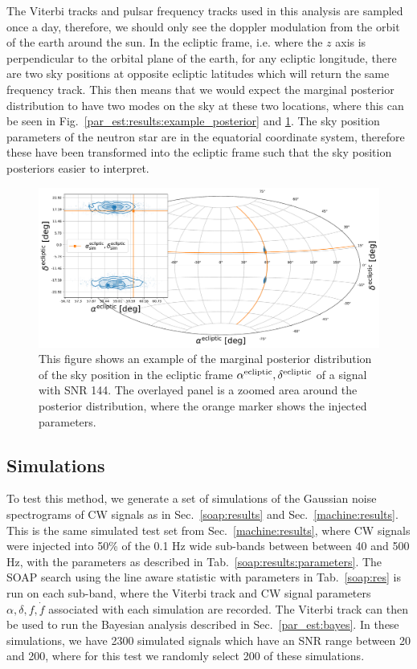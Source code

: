 The Viterbi tracks and pulsar frequency tracks used in this analysis are sampled once a day, therefore, we should only see the doppler modulation from the orbit of the earth around the sun.
In the ecliptic frame, i.e. where the $z$ axis is perpendicular to the orbital plane of the earth, for any ecliptic longitude, there are two sky positions at opposite ecliptic latitudes which will return the same frequency track. 
This then means that we would expect the marginal posterior distribution to have two modes on the sky at these two locations, where this can be seen in Fig.~\ref{par_est:results:example_posterior} and \ref{par_est:results:example_skypos}.
The sky position parameters of the neutron star are in the equatorial coordinate system, therefore these have been transformed into the ecliptic frame such that the sky position posteriors easier to interpret.
%
\begin{figure}[ht]
    \centering
    \includegraphics[width=\linewidth]{C5_parameter/skypos_ecliptic.pdf}
    \caption[Example of posterior of sky position in ecliptic frame]{This figure shows an example of the marginal posterior distribution of the sky position in the ecliptic frame $\alpha^{\rm{ecliptic}},\delta^{\rm{ecliptic}}$ of a signal with \gls{SNR} 144. The overlayed panel is a zoomed area around the posterior distribution, where the orange marker shows the injected parameters.}
    \label{par_est:results:example_skypos}
    
\end{figure}
%

%
%
\subsection{Simulations}
%
%
To test this method, we generate a set of simulations of the Gaussian noise spectrograms of \gls{CW} signals as in Sec.~\ref{soap:results} and Sec.~\ref{machine:results}.
This is the same simulated test set from Sec.~\ref{machine:results}, where \gls{CW} signals were injected into 50\% of the 0.1 Hz wide sub-bands between between 40 and 500 Hz, with the parameters as described in Tab.~\ref{soap:results:parameters}. 
The SOAP search using the line aware statistic with parameters in Tab.~\ref{soap:res}  is run on each sub-band, where the Viterbi track and \gls{CW} signal parameters $\alpha, \delta, f, \dot{f}$ associated with each simulation are recorded.
The Viterbi track can then be used to run the Bayesian analysis described in Sec.~\ref{par_est:bayes}.
In these simulations, we have 2300 simulated signals which have an \gls{SNR} range between 20 and 200, where for this test we randomly select 200 of these simulations.

